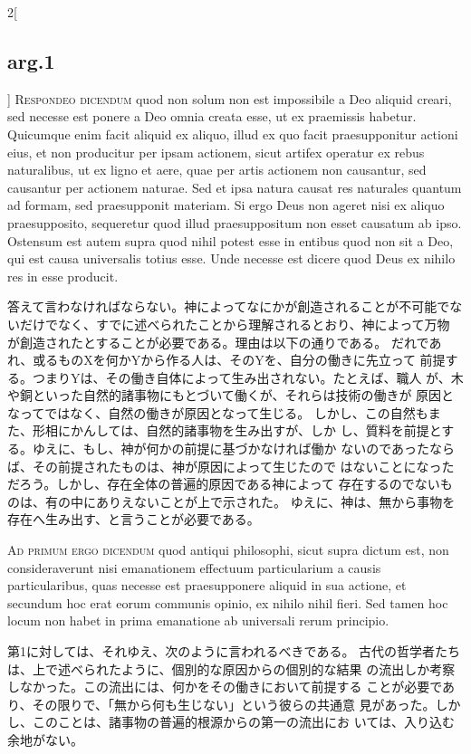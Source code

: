 \documentclass[paper=a4paper,fontsize=10pt,jafontsize=9pt,titlepage]{jlreq}
\begin{document}
\begin{paracol}{2}[\subsection{arg.1}]
{\scshape Respondeo dicendum} quod non solum non est impossibile a Deo aliquid
 creari, sed necesse est ponere a Deo omnia creata esse, ut ex
 praemissis habetur. Quicumque enim facit aliquid ex aliquo, illud ex
 quo facit praesupponitur actioni eius, et non producitur per ipsam
 actionem, sicut artifex operatur ex rebus naturalibus, ut ex ligno et
 aere, quae per artis actionem non causantur, sed causantur per actionem
 naturae. Sed et ipsa natura causat res naturales quantum ad formam, sed
 praesupponit materiam. Si ergo Deus non ageret nisi ex aliquo
 praesupposito, sequeretur quod illud praesuppositum non esset causatum
 ab ipso. Ostensum est autem supra quod nihil potest esse in entibus
 quod non sit a Deo, qui est causa universalis totius esse. Unde necesse
 est dicere quod Deus ex nihilo res in esse producit.

\switchcolumn

答えて言わなければならない。神によってなにかが創造されることが不可能でな
 いだけでなく、すでに述べられたことから理解されるとおり、神によって万物
 が創造されたとすることが必要である。理由は以下の通りである。
だれであれ、或るものXを何かYから作る人は、そのYを、自分の働きに先立って
 前提する。つまりYは、その働き自体によって生み出されない。たとえば、職人
 が、木や銅といった自然的諸事物にもとづいて働くが、それらは技術の働きが
 原因となってではなく、自然の働きが原因となって生じる。
しかし、この自然もまた、形相にかんしては、自然的諸事物を生み出すが、しか
 し、質料を前提とする。ゆえに、もし、神が何かの前提に基づかなければ働か
 ないのであったならば、その前提されたものは、神が原因によって生じたので
 はないことになっただろう。しかし、存在全体の普遍的原因である神によって
 存在するのでないものは、有の中にありえないことが上で示された。
ゆえに、神は、無から事物を存在へ生み出す、と言うことが必要である。

\switchcolumn*[\subsection{ad.1}]

{\scshape Ad primum ergo dicendum} quod antiqui philosophi, sicut supra dictum est,
 non consideraverunt nisi emanationem effectuum particularium a causis
 particularibus, quas necesse est praesupponere aliquid in sua actione,
 et secundum hoc erat eorum communis opinio, ex nihilo nihil fieri. Sed
 tamen hoc locum non habet in prima emanatione ab universali rerum
 principio.

\switchcolumn

第1に対しては、それゆえ、次のように言われるべきである。
古代の哲学者たちは、上で述べられたように、個別的な原因からの個別的な結果
 の流出しか考察しなかった。この流出には、何かをその働きにおいて前提する
 ことが必要であり、その限りで、「無から何も生じない」という彼らの共通意
 見があった。しかし、このことは、諸事物の普遍的根源からの第一の流出にお
 いては、入り込む余地がない。


\end{paracol}
\end{document}
